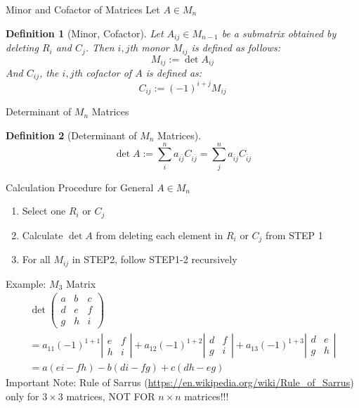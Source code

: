\documentclass[final]{beamer}
\newtheorem{defn}{Definition}
\begin{document}
\begin{frame}[t]{Minor and Cofactor of Matrices}
	Let $A\in M_n$
	\begin{defn}
		[Minor, Cofactor]
		Let $A_{ij}\in M_{n-1}$ be a submatrix obtained by deleting $R_i$ and $C_j$. Then $i,j$th monor $M_{ij}$ is defined as follows:
		\[
			M_{ij}:= \det A_{ij}
		\]
		And $C_{ij}$, the $i,j$th cofactor of $A$ is defined as:
		\[
			C_{ij}:= (-1)^{i+j}M_{ij}
		\]
	\end{defn}

\end{frame}
\begin{frame}[t]{Determinant of $M_n$ Matrices}
	\begin{defn}
		[Determinant of $M_n$ Matrices]
		\[
			\det A := \sum_i^n a_{i \bar j}C_{i \bar j} = \sum_j^n a_{\bar i j}C_{\bar i j}
		\]
	\end{defn}
	\begin{block}
		{Calculation Procedure for General $A\in M_n$}
		\begin{enumerate}[STEP 1:]
			\item Select one $R_i$ or $C_j$
			\item Calculate $\det A$ from deleting each element in $R_i$ or $C_j$ from STEP 1
			\item For all $M_{ij}$ in STEP2, follow STEP1-2 recursively
		\end{enumerate}
	\end{block}
\end{frame}

\begin{frame}[t]{Example: $M_3$ Matrix}
	\begin{multline*}
		\det \begin{pmatrix}
			a &b & c \\
			d&e&f\\
			g&h&i
		\end{pmatrix} 
		\\= a_{11} (-1)^{1+1}\left\vert \begin{matrix}
			e&f\\
			h&i
		\end{matrix}\right\vert + a_{12} (-1)^{1+2}\left\vert \begin{matrix}
			d&f\\
			g&i
		\end{matrix}\right\vert + a_{13} (-1)^{1+3}\left\vert \begin{matrix}
			d&e\\
			g&h
		\end{matrix}\right\vert 
		\\= a(ei-fh)-b(di-fg)+c(dh-eg)
	\end{multline*}
	Important Note: Rule of Sarrus (\url{https://en.wikipedia.org/wiki/Rule_of_Sarrus}) only for $3\times 3$ matrices, NOT FOR $n\times n$ matrices!!!
\end{frame}
\end{document}
